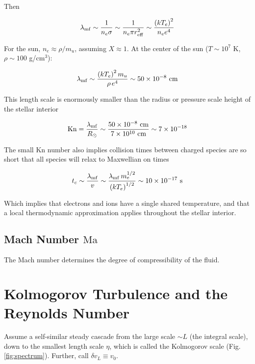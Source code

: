 \documentclass[notoc]{tufte-handout}
\begin{document}
Then

\begin{equation}
\lambda_{\rm mf} \sim \frac{1}{n_e \sigma} \sim \frac{1}{n_e \pi r_{\rm eff}^2} \sim \frac{\left( k T_e \right)^2}{n_e e^4}
\end{equation}

For the sun, $n_e \approx \rho / m_u$, assuming $X \approx 1$. At the center of the sun ($T \sim 10^7$ K, $\rho \sim 100$ g/cm$^3$):

\begin{equation}
\lambda_{\rm mf} \sim \frac{\left( k T_e \right)^2 m_u}{\rho \, e^4} \sim 50 \times 10^{-8}~\text{cm}
\end{equation}

This length scale is enormously smaller than the radius or pressure scale height of the stellar interior

\begin{equation}
\mathrm{Kn} = \frac{\lambda_{\rm mf}}{R_\odot} \sim \frac{50 \times 10^{-8}~\text{cm}}{7 \times 10^{10}~\text{cm}} \sim 7 \times 10^{-18}
\end{equation}

The small $\mathrm{Kn}$ number also implies collision times between charged species are so short that all species will relax to Maxwellian on times

\begin{equation}
t_c \sim \frac{\lambda_{\rm mf}}{v} \sim \frac{\lambda_{\rm mf} \, m_e^{1/2}}{\left( k T_e \right)^{1/2}} \sim 10 \times 10^{-17}~\text{s}
\end{equation}

Which implies that electrons and ions have a single shared temperature, and that a local thermodynamic approximation applies throughout the stellar interior.

\subsection{Mach Number \texorpdfstring{$\mathrm{Ma}$}{Ma}}

The Mach number determines the degree of compressibility of the fluid.


\section{Kolmogorov Turbulence and the Reynolds Number}

Assume a self-similar steady cascade from the large scale $\sim L$ (the integral scale), down to the smallest length scale $\eta$, which is called the Kolmogorov scale (Fig. \ref{fig:spectrum}). Further, call $\delta v_L \equiv v_0$.
\end{document}
